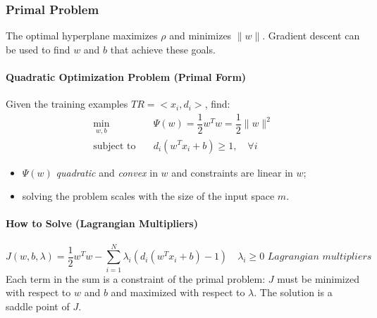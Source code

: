 \subsubsection{Primal Problem}

The optimal hyperplane maximizes \(\rho\) and minimizes \(\|w\|\). Gradient descent can be used to find \(w\) and \(b\) that achieve these goals.
\paragraph{Quadratic Optimization Problem (Primal Form)}
Given the training examples $TR = < x_i,d_i >$, find:
\begin{equation}
\begin{aligned}
    \min_{w,b} \quad & \Psi(w) = \dfrac{1}{2} w^T w = \dfrac{1}{2} \|w\|^2 \\
    \text{subject to} \quad & d_i (w^T x_i + b) \geq 1, \quad \forall i
\end{aligned}
\end{equation}
\begin{itemize}
    \item $\Psi (w)$ \textit{quadratic} and \textit{convex} in $w$ and constraints are linear in $w$;
    \item solving the problem scales with the size of the input space $m$.
\end{itemize}
\paragraph{How to Solve (Lagrangian Multipliers)}
\begin{equation}
    J(w,b,\lambda) = \dfrac{1}{2}w^T w - \sum_{i=1}^N \lambda_i(d_i(w^T x_i + b) - 1) \quad \lambda_i \geq 0 \textit{ Lagrangian multipliers}
\end{equation}
Each term in the sum is a constraint of the primal problem: $J$ must be minimized with respect to $w$ and $b$ and maximized with respect to $\lambda$. The solution is a saddle point of $J$.

